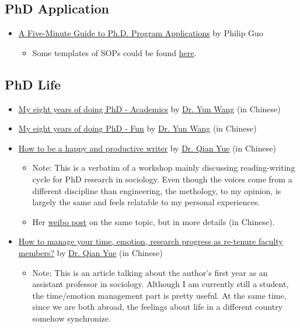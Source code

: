 \documentclass[11pt]{article}
\begin{document}
\subsection{PhD Application}
\label{sec-7-3}
\begin{itemize}
\item \href{http://pgbovine.net/PhD-application-tips.htm}{A Five-Minute Guide to Ph.D. Program Applications} by Philip Guo
\begin{itemize}
\item Some templates of SOPs could be found \href{http://pgbovine.net/PhD-application-essay-examples.htm}{here}.
\end{itemize}
\end{itemize}
\subsection{PhD Life}
\label{sec-7-4}
\begin{itemize}
\item \href{https://zhuanlan.zhihu.com/p/50597445}{My eight years of doing PhD - Academics} by \href{http://www.cs.cmu.edu/~yunwang/}{Dr. Yun Wang} (in Chinese)
\item \href{https://zhuanlan.zhihu.com/p/50667670}{My eight years of doing PhD - Fun} by  \href{http://www.cs.cmu.edu/~yunwang/}{Dr. Yun Wang} (in Chinese)
\item \href{https://mp.weixin.qq.com/s?__biz=MzI1OTA4Mjk3NA==&mid=2650830984&idx=1&sn=f963f564dfe1e01996e3c4545fd5c793}{How to be a happy and productive writer} by \href{https://sociology.ubc.ca/profile/yue-qian/}{Dr. Qian Yue} (in Chinese)
\begin{itemize}
\item Note: This is a verbatim of a workshop mainly discussing reading-writing cycle
for PhD research in sociology. Even though the voices come from a different
discipline than engineering, the methology, to my opinion, is largely the same and
feels relatable to my personal experiences.
\item Her \href{https://www.weibo.com/p/1001603935693545055068}{weibo post} on the same topic, but in more details (in Chinese).
\end{itemize}
\item \href{https://mp.weixin.qq.com/s/50iNupppOyGLDt4cJmYk3Q}{How to manage your time, emotion, research progress as re-tenure faculty members?} by \href{https://sociology.ubc.ca/profile/yue-qian/}{Dr. Qian Yue} (in Chinese)
\begin{itemize}
\item Note: This is an article talking about the author's first year as an assistant professor in sociology.
Although I am currently still a student, the time/emotion  management part is pretty useful. At the same time, 
since we are both abroad, the feelings about life in a different country somehow synchronize.
\end{itemize}
\end{itemize}
\end{document}
